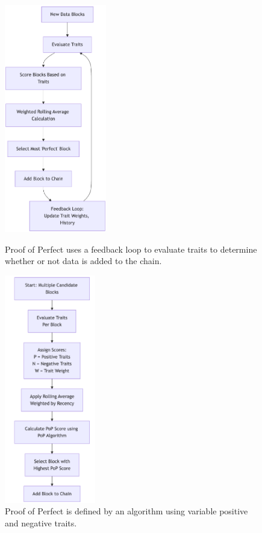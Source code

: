 \documentclass{article}
\begin{document}
\begin{figure}[h]
\centering
\begin{minipage}[t]{0.48\textwidth}
    \centering
    \vspace{0pt}
    \includegraphics[height=10cm]{proof-of-perfect-flow.png}
    \caption{Proof of Perfect uses a feedback loop to evaluate traits to determine whether or not data is added to the chain.}
\end{minipage}
\hfill
\begin{minipage}[t]{0.48\textwidth}
    \centering
    \vspace{0pt}
    \includegraphics[height=10cm]{proof-of-perfect-algorithm.png}
    \caption{Proof of Perfect is defined by an algorithm using variable positive and negative traits.}
\end{minipage}
\end{figure}
\end{document}
